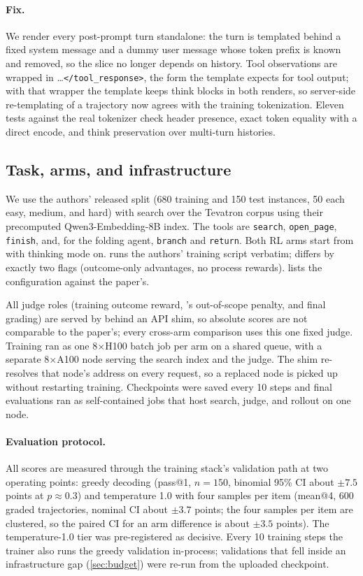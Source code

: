 \paragraph{Fix.} We render every post-prompt turn standalone: the turn is templated behind a
fixed system message and a dummy user message whose token prefix is known and removed, so the
slice no longer depends on history. Tool observations are wrapped in
\toolresp{}\ldots\texttt{</tool\_response>}, the form the \qwen{} template expects for tool
output; with that wrapper the template keeps think blocks in both renders, so server-side
re-templating of a trajectory now agrees with the training tokenization. Eleven tests against
the real \qwen{} tokenizer check header presence, exact token equality with a direct encode,
and think preservation over multi-turn histories.

\subsection{Task, arms, and infrastructure}

We use the authors' released \bcplus{} split (680 training and 150 test instances, 50 each
easy, medium, and hard) with search over the Tevatron \bcplus{} corpus using their precomputed
Qwen3-Embedding-8B index. The tools are \texttt{search}, \texttt{open\_page},
\texttt{finish}, and, for the folding agent, \texttt{branch} and \texttt{return}. Both RL arms
start from \qwen{} with thinking mode on. \foldgrpo{} runs the authors' training script
verbatim; \grpo{} differs by exactly two flags (outcome-only advantages, no process rewards).
 lists the configuration against the paper's.

All judge roles (training outcome reward, \foldgrpo{}'s out-of-scope penalty, and final
grading) are served by \judgemodel{} behind an API shim, so absolute scores are not comparable
to the paper's; every cross-arm comparison uses this one fixed judge. Training ran as one
8$\times$H100 batch job per arm on a shared queue, with a separate 8$\times$A100 node serving
the search index and the judge. The shim re-resolves that node's address on every request, so a
replaced node is picked up without restarting training. Checkpoints were saved every 10 steps
and final evaluations ran as self-contained jobs that host search, judge, and rollout on one
node.

\paragraph{Evaluation protocol.} All scores are measured through the training stack's
validation path at two operating points: greedy decoding (pass@1, $n{=}150$, binomial 95\% CI
about $\pm 7.5$ points at $p \approx 0.3$) and temperature 1.0 with four samples per item
(mean@4, 600 graded trajectories, nominal CI about $\pm 3.7$ points; the four samples per item
are clustered, so the paired CI for an arm difference is about $\pm 3.5$ points). The
temperature-1.0 tier was pre-registered as decisive. Every 10 training steps the trainer also
runs the greedy validation in-process; validations that fell inside an infrastructure gap
(\cref{sec:budget}) were re-run from the uploaded checkpoint.

